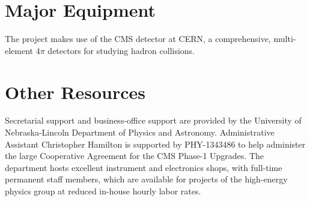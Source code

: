 \documentclass[11pt]{article}
\begin{document}
\section{Major Equipment}

The project makes use of the CMS detector at CERN, a comprehensive,
multi-element $4\pi$ detectors for studying hadron collisions.  

\section{Other Resources}

Secretarial support and business-office support are provided by the
University of Nebraska-Lincoln Department of Physics and Astronomy.  Administrative Assistant Christopher Hamilton is supported by PHY-1343486 to help administer the large Cooperative Agreement for the CMS Phase-1 Upgrades.  The
department hosts excellent instrument and electronics shops, with full-time
permanent staff members, which are available for projects of the high-energy
physics group at reduced in-house hourly labor rates.
\end{document}

